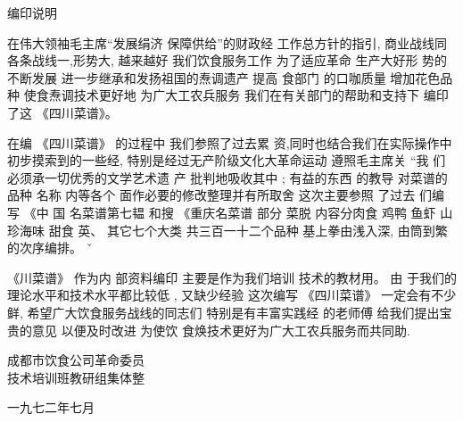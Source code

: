 编印说明

在伟大领袖毛主席“发展绢济 保障供给”的财政经 工作总方针的指引, 商业战线同 各条战线一,形势大, 越来越好 我们饮食服务工作 为了适应革命 生产大好形 势的不断发展 进一步继承和发扬祖国的焘调遗产 提高 食部门 的口咖质量 增加花色品种 使食焘调技术更好地 为广大工农兵服务 我们在有关部门的帮助和支持下 编印 了这 《四川菜谱》。 

在编 《四川菜谱》 的过程中 我们参照了过去累 资,同时也结合我们在实际操作中初步摸索到的一些经, 特别是经过无产阶级文化大革命运动 遵照毛主席关 “我 们必须承一切优秀的文学艺术遗 产 批判地吸收其中 ; 有益的东西 的教导 对菜谱的品种 名称 内等各个 面作必要的修改整理并有所取舍 这次主要参照 了过去 们编 写 《中 国 名菜谱第七韫 和搜 《重庆名菜谱 部分 菜脱 内容分肉食 鸡鸭 鱼虾 山珍海味 甜食 英、 其它七个大类 共三百一十二个品种 基上拳由浅入深, 由筒到繁的次序编排。 ˇ 

《川菜谱》 作为内 部资料编印 主要是作为我们培训 技术的教材用。 由 于我们的理论水平和技术水平都比较低 , 又缺少经验 这次编写 《四川菜谱》 一定会有不少鲜, 希望广大饮食服务战线的同志们 特别是有丰富实践经 的老师傅 给我们提出宝贵的意见 以便及时改进 为使饮 食焕技术更好为广大工农兵服务而共同助. 

成都市饮食公司革命委员\\
技术培训班教研组集体整

一九七二年七月
